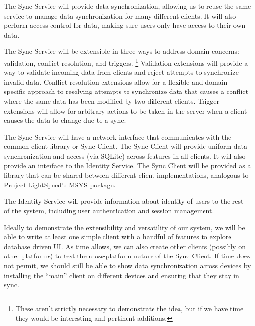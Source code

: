 \documentclass[12pt]{article}
\begin{document}
    The Sync Service will provide data synchronization, allowing us to reuse the same service to manage data synchronization for many different clients.
    It will also perform access control for data, making sure users only have access to their own data.

    The Sync Service will be extensible in three ways to address domain concerns: validation, conflict resolution, and triggers.
        \footnote{These aren't strictly necessary to demonstrate the idea, but if we have time they would be interesting and pertinent additions.}
        Validation extensions will provide a way to validate incoming data from clients and reject attempts to synchronize invalid data.
        Conflict resolution extensions allow for a flexible and domain specific approach to resolving attempts to synchronize data that causes a conflict where the same data has been modified by two different clients.
        Trigger extensions will allow for arbitrary actions to be taken in the server when a client causes the data to change due to a sync.

    The Sync Service will have a network interface that communicates with the common client library or Sync Client.
    The Sync Client will provide uniform data synchronization and access (via SQLite) across features in all clients.
    It will also provide an interface to the Identity Service.
        The Sync Client will be provided as a library that can be shared between different client implementations, analogous to Project LightSpeed's MSYS package.

    The Identity Service will provide information about identity of users to the rest of the system, including user authentication and session management.

    Ideally to demonstrate the extensibility and versatility of our system, we will be able to write at least one simple client with a handful of features to explore database driven UI.
    As time allows, we can also create other clients (possibly on other platforms) to test the cross-platform nature of the Sync Client.
    If time does not permit, we should still be able to show data synchronization across devices by installing the “main” client on different devices and ensuring that they stay in sync.

\end{document}

